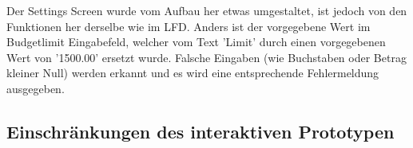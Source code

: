 \documentclass[a4paper,10pt]{article}
\begin{document}
Der Settings Screen wurde vom Aufbau her etwas umgestaltet, ist jedoch von den Funktionen her derselbe wie im LFD. Anders ist 
der vorgegebene Wert im Budgetlimit Eingabefeld, welcher vom Text 'Limit' durch einen vorgegebenen Wert von '1500.00' ersetzt
wurde. Falsche Eingaben (wie Buchstaben oder Betrag kleiner Null) werden erkannt und es wird eine entsprechende Fehlermeldung ausgegeben.


\clearpage
\subsection{Einschr\"ankungen des interaktiven Prototypen}

\end{document}
